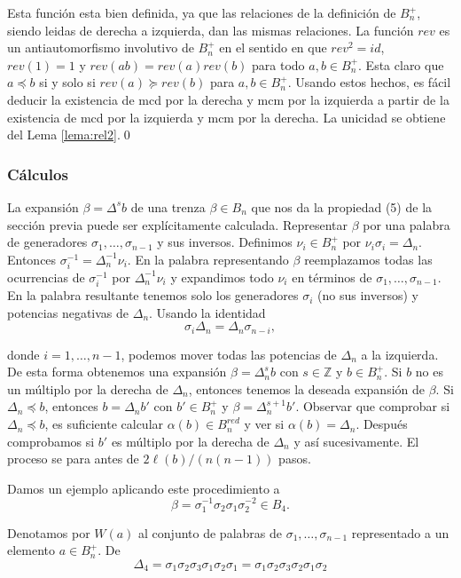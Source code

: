 \documentclass[12pt]{article}
\theoremstyle{definition}
\begin{document}
Esta función esta bien definida, ya que las relaciones de la definición de $B_n^+$, siendo leidas de derecha a izquierda, dan las mismas relaciones. La función $rev$ es un antiautomorfismo involutivo de $B_n^+$ en el sentido en que $rev^2=id$, $rev(1)=1$ y $rev(ab)=rev(a)rev(b)$ para todo $a,b\in B_n^+$. Esta claro que $a\preceq b$ si y solo si $rev(a)\succeq rev(b)$ para $a,b\in B_n^+$. Usando estos hechos, es fácil deducir la existencia de mcd por la derecha y mcm por la izquierda a partir de la existencia de mcd por la izquierda y mcm por la derecha. La unicidad se obtiene del Lema \ref{lema:rel2}.\qed

\subsubsection{Cálculos}

La expansión $\beta=\Delta^sb$ de una trenza $\beta\in B_n$ que nos da la propiedad (5) de la sección previa puede ser explícitamente calculada. Representar $\beta$ por una palabra de generadores $\sigma_1,\ldots,\sigma_{n-1}$ y sus inversos. Definimos $\nu_i\in B_n^+$ por $\nu_i\sigma_i=\Delta_n$. Entonces $\sigma_i^{-1}=\Delta_n^{-1}\nu_i$. En la palabra representando $\beta$ reemplazamos todas las ocurrencias de $\sigma_i^{-1}$ por $\Delta_n^{-1}\nu_i$ y expandimos todo $\nu_i$ en términos de $\sigma_1,\ldots,\sigma_{n-1}$. En la palabra resultante tenemos solo los generadores $\sigma_i$ (no sus inversos) y potencias negativas de $\Delta_n$. Usando la identidad
\begin{equation}
\sigma_i\Delta_n=\Delta_n\sigma_{n-i},
\end{equation}

donde $i=1,\ldots,n-1$, podemos mover todas las potencias de $\Delta_n$ a la izquierda. De esta forma obtenemos una expansión $\beta=\Delta_n^sb$ con $s\in\mathbb{Z}$ y $b\in B_n^+$. Si $b$ no es un múltiplo por la derecha de $\Delta_n$, entonces tenemos la deseada expansión de $\beta$. Si $\Delta_n\preceq b$, entonces $b=\Delta_n b'$ con $b'\in B_n^+$ y $\beta=\Delta_n^{s+1}b'$. Observar que comprobar si $\Delta_n\preceq b$, es suficiente calcular $\alpha(b)\in B_n^{red}$ y ver si $\alpha(b)=\Delta_n$. Después comprobamos si $b'$ es múltiplo por la derecha de $\Delta_n$ y así sucesivamente. El proceso se para antes de $2\ell(b)/(n(n-1))$ pasos.

Damos un ejemplo aplicando este procedimiento a
$$\beta=\sigma_1^{-1}\sigma_2\sigma_1\sigma_2^{-2}\in B_4.$$

Denotamos por $W(a)$ al conjunto de palabras de $\sigma_1,\ldots,\sigma_{n-1}$ representado a un elemento $a\in B_n^+$. De
$$\Delta_4=\sigma_1\sigma_2\sigma_3\sigma_1\sigma_2\sigma_1=\sigma_1\sigma_2\sigma_3\sigma_2\sigma_1\sigma_2$$
\end{document}
